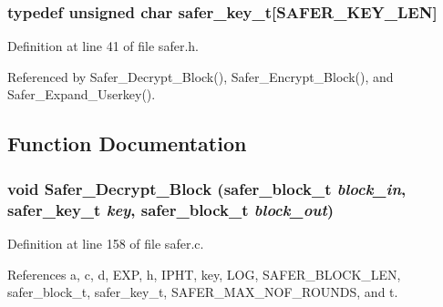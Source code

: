 \subsubsection{\setlength{\rightskip}{0pt plus 5cm}typedef unsigned char {\bf safer\_\-key\_\-t}[SAFER\_\-KEY\_\-LEN]}\label{safer_8h_a8}




Definition at line 41 of file safer.h.

Referenced by Safer\_\-Decrypt\_\-Block(), Safer\_\-Encrypt\_\-Block(), and Safer\_\-Expand\_\-Userkey().

\subsection{Function Documentation}
\subsubsection{\setlength{\rightskip}{0pt plus 5cm}void Safer\_\-Decrypt\_\-Block ({\bf safer\_\-block\_\-t} {\em block\_\-in}, {\bf safer\_\-key\_\-t} {\em key}, {\bf safer\_\-block\_\-t} {\em block\_\-out})}\label{safer_8h_a12}




Definition at line 158 of file safer.c.

References a, c, d, EXP, h, IPHT, key, LOG, SAFER\_\-BLOCK\_\-LEN, safer\_\-block\_\-t, safer\_\-key\_\-t, SAFER\_\-MAX\_\-NOF\_\-ROUNDS, and t.



